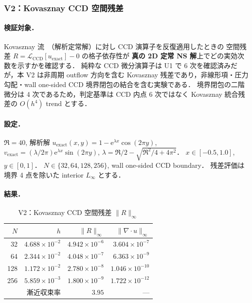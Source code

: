 \FloatBarrier

\subsubsection{V2：Kovasznay CCD 空間残差}
\label{sec:kovasznay}

\paragraph{検証対象．}
Kovasznay 流~\cite{Kovasznay1948}（解析定常解）に対し CCD 演算子を反復適用したときの
空間残差 $R = \mathcal{L}_{\mathrm{CCD}}[u_{\mathrm{exact}}] - 0$ の格子依存性が
\textbf{真の 2D 定常 NS 解}上でどの実効次数を示すかを確認する．
純粋な CCD 微分演算子は U1 で 6 次を確認済みだが，本 V2 は非周期 outflow 方向を含む
Kovasznay 残差であり，非線形項・圧力勾配・wall one-sided CCD 境界閉包の結合を含む実験である．
境界閉包の二階微分は 4 次であるため，判定基準は CCD 内点 6 次ではなく
Kovasznay 統合残差の $O(h^4)$ trend とする．

\paragraph{設定．}
$\Re = 40$, 解析解 $u_{\mathrm{exact}}(x,y) = 1 - \mathrm{e}^{\lambda x}\cos(2\pi y)$,
$v_{\mathrm{exact}} = (\lambda/2\pi) \mathrm{e}^{\lambda x}\sin(2\pi y)$,
$\lambda = \Re/2 - \sqrt{\Re^2/4 + 4\pi^2}$．
$x\in[-0.5,1.0]$, $y\in[0,1]$．
$N \in \{32,64,128,256\}$, wall one-sided CCD boundary．
残差評価は境界 4 点を除いた interior $L_\infty$ とする．

\paragraph{結果．}
\begin{table}[!ht]
\caption{V2：Kovasznay CCD 空間残差 \texorpdfstring{$\|R\|_\infty$}{||R||_infinity}}
\label{tab:V2_spatial}
\centering\small
\begin{tabular}{r r r r}
\toprule
$N$ & $h$ & $\|R\|_\infty$ & $\|\nabla\!\cdot u\|_\infty$ \\
\midrule
32  & $4.688\times 10^{-2}$ & $4.942\times 10^{-6}$ & $3.604\times 10^{-7}$ \\
64  & $2.344\times 10^{-2}$ & $4.048\times 10^{-7}$ & $6.363\times 10^{-9}$ \\
128 & $1.172\times 10^{-2}$ & $2.780\times 10^{-8}$ & $1.046\times 10^{-10}$ \\
256 & $5.859\times 10^{-3}$ & $1.800\times 10^{-9}$ & $1.722\times 10^{-12}$ \\
\midrule
\multicolumn{2}{r}{漸近収束率} & $\mathbf{3.95}$ & --- \\
\bottomrule
\end{tabular}
\end{table}

